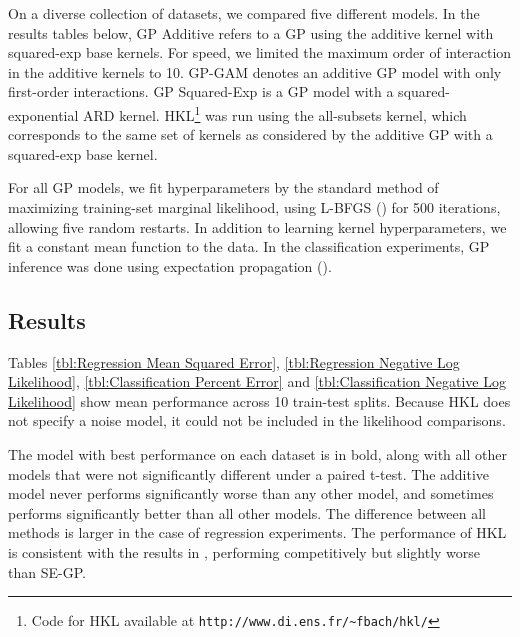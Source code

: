 On a diverse collection of datasets, we compared five different models.  In the results tables below, GP Additive refers to a GP using the additive kernel with squared-exp base kernels.  For speed, we limited the maximum order of interaction in the additive kernels to 10.  GP-GAM denotes an additive GP model with only first-order interactions.  GP Squared-Exp is a GP model with a squared-exponential ARD kernel.  HKL\footnote{Code for HKL available at \texttt{http://www.di.ens.fr/\textasciitilde fbach/hkl/}} was run using the all-subsets kernel, which corresponds to the same set of kernels as considered by the additive GP with a squared-exp base kernel.     

For all GP models, we fit hyperparameters by the standard method of maximizing training-set marginal likelihood, using L-BFGS (\cite{nocedal1980updating}) for 500 iterations, allowing five random restarts.  In addition to learning kernel hyperparameters, we fit a constant mean function to the data.
%
In the classification experiments, GP inference was done using expectation propagation (\cite{minka2001expectation}).
 
\subsection{Results}

Tables \ref{tbl:Regression Mean Squared Error}, \ref{tbl:Regression Negative Log Likelihood}, \ref{tbl:Classification Percent Error} and \ref{tbl:Classification Negative Log Likelihood} show mean performance across 10 train-test splits.  Because HKL does not specify a noise model, it could not be included in the likelihood comparisons.






The model with best performance on each dataset is in bold, along with all other models that were not significantly different under a paired t-test. The additive model never performs significantly worse than any other model, and sometimes performs significantly better than all other models.  The difference between all methods is larger in the case of regression experiments. The performance of HKL is consistent with the results in \cite{DBLP:journals/corr/abs-0909-0844}, performing competitively but slightly worse than SE-GP.%

